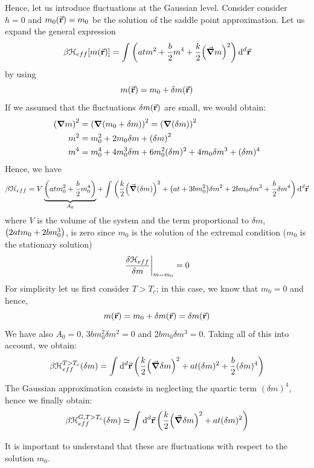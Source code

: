 \documentclass[../../Main/Main.tex]{subfiles}
\begin{document}
Hence, let us introduce fluctuations at the Gaussian level. Consider consider \( h=0 \) and \( m_0 (\va{r})= m_0 \) be the solution of the saddle point approximation. Let us expand the general expression
\begin{equation*}
  \beta \mathcal{H}_{eff}  [m (\va{r})] = \int_{}^{}  \qty( a t m^2 + \frac{b}{2} m^4 + \frac{k}{2} \qty(\va{\grad } m)^2 ) \dd[d]{\va{r}}
\end{equation*}
by using
\begin{equation*}
  m(\va{r}) = m_0 + \delta m(\va{r})
\end{equation*}
If we assumed that the fluctuations \(  \delta m(\va{r})\) are small, we would obtain:
\begin{subequations}
\begin{align*}
   \qty(\grad m)^2 &= \qty(\grad \qty(m_0 + \delta m) )^2 = \qty(\grad \qty(\delta m) )^2  \\
     m^2 &= m_0^2 + 2 m_0 \delta m + \qty(\delta m)^2 \\
     m^4 &= m_0^4 + 4 m_0^3 \delta m + 6 m_0^2 (\delta m)^2 + 4 m_0 \delta m^3 + (\delta m)^4
\end{align*}
\end{subequations}
Hence, we have
\begin{equation}
  \beta \mathcal{H}_{eff} = V \underbrace{ \qty(a t m_0^2 + \frac{b}{2} m_0^4) }_{A_0}
  + \int_{}^{} \qty(\frac{k}{2}\qty( \va{\grad } (\delta m))^2 + \qty(a t + 3 b m_0^2)\delta  m^2 + 2 b m_0 \delta m^3 + \frac{b}{2} \delta m^4 )\dd[d]{\va{r}}
  \label{eq:18_10}
\end{equation}
where \( V \) is the volume of the system and the term proportional to \( \delta m \),  \( \qty( 2 a t m_0  +  2b m_0^3 )  \), is zero since \( m_0 \) is the solution of the extremal condition (\( m_0 \) is the stationary solution)
\begin{equation*}
  \eval{\frac{\delta \mathcal{H}_{eff}}{\delta m}}_{m=m_0} = 0
\end{equation*}
For simplicity let us first consider \( T>T_c \); in this case, we know that \( m_0 = 0 \) and hence,
\begin{equation*}
   m (\va{r}) = m_0 + \delta m(\va{r}) = \delta m (\va{r})
\end{equation*}
We have also \( A_0 =0 \),  \( 3bm_0^2 \delta m^2 = 0 \) and \( 2 b m_0 \delta m^3 = 0 \). Taking all of this into account, we obtain:
\begin{equation*}
  \beta \mathcal{H}_{eff}^{T>T_c} (\delta m)= \int_{}^{} \dd[d]{\va{r}} \qty(\frac{k}{2} \qty(\va{\grad }\delta m)^2 + a t (\delta m)^2 + \frac{b}{2} (\delta m)^4 )
\end{equation*}
The Gaussian approximation consists in neglecting the quartic term \( (\delta m)^4 \), hence we finally obtain:
\begin{equation}
    \beta \mathcal{H}_{eff}^{G,T>T_c} (\delta m) \simeq  \int_{}^{} \dd[d]{\va{r}} \qty(\frac{k}{2} \qty( \va{\grad } \delta m)^2 + a t (\delta m)^2 )
    \label{eq:18_4}
\end{equation}
\begin{remark}
It is important to understand that these are fluctuations with respect to the solution \( m_0 \).
\end{remark}
\end{document}
